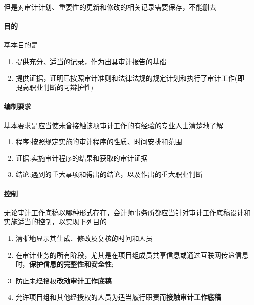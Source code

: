 \documentclass[UTF8,12pt]{ctexart}
\numberwithin{equation}{section} %
\numberwithin{figure}{section}
\numberwithin{table}{section}
\begin{document}
	但是对审计计划、重要性的更新和修改的相关记录需要保存，不能删去
	
	\paragraph{目的}
	基本目的是
	\begin{enumerate}
		\item 提供充分、适当的记录，作为出具审计报告的基础
		
		\item 提供证据，证明已按照审计准则和法律法规的规定计划和执行了审计工作(即提高职业判断的可辩护性)
	\end{enumerate}
	
	\paragraph{编制要求}
	基本要求是应当使未曾接触该项审计工作的有经验的专业人士清楚地了解
	\begin{enumerate}
		\item 程序:按照规定实施的审计程序的性质、时间安排和范围
		
		\item 证据:实施审计程序的结果和获取的审计证据
		
		\item 结论:遇到的重大事项和得出的结论，以及作出的重大职业判断
	\end{enumerate}
	
	\paragraph{控制}
	无论审计工作底稿以哪种形式存在，会计师事务所都应当针对审计工作底稿设计和实施适当的控制，以实现下列目的
	\begin{enumerate}
		\item 清晰地显示其生成、修改及复核的时间和人员
		
		\item 在审计业务的所有阶段，尤其是在项目组成员共享信息或通过互联网传递信息时，\textbf{保护信息的完整性和安全性};
		
		\item 防止未经授权\textbf{改动审计工作底稿}
		
		\item 允许项目组和其他经授权的人员为适当履行职责而\textbf{接触审计工作底稿}
	\end{enumerate}
	
\end{document}
